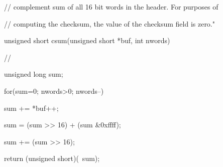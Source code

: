 \documentclass[a4paper,12pt]{article}
\begin{document}
		    //  complement sum of all 16 bit words in the header.  For purposes of
		
		    //  computing the checksum, the value of the checksum field is zero."
		
		    unsigned short csum(unsigned short *buf, int nwords)
		
		    {       //
		
		            unsigned long sum;
		
		            for(sum=0; nwords>0; nwords--)
		
		                    sum += *buf++;
		
		            sum = (sum >> 16) + (sum &0xffff);
		
		            sum += (sum >> 16);
		
		            return (unsigned short)(~sum);
		
		    }
		
		
		
		
		
		
		
		
		
		
		    
\end{document}

